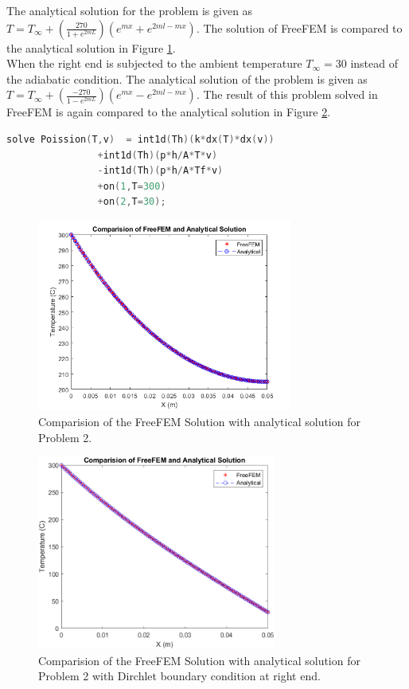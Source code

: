 \documentclass[11pt]{article} %
\begin{document}
The analytical solution for the problem is given as $T =  T_{\infty} + \left(\frac{270}{1+e^{2mL}}\right) \left(e^{mx} + e^{2ml -mx} \right)$. The solution of FreeFEM is compared to the analytical solution in Figure \ref{fig:q2}.\\

When the right end is subjected to the ambient temperature $ T_{\infty} = 30$ instead of the adiabatic condition. The analytical solution of the problem is given as $T =  T_{\infty} + \left(\frac{-270}{1-e^{2mL}}\right) \left(e^{mx} - e^{2ml -mx} \right)$. The result of this problem solved in FreeFEM is again compared to the analytical solution in Figure \ref{fig:q22}.\\

\vspace{0.5cm}

\begin{lstlisting}[language=C++, caption=Change in the Problem 2 Code to accomodate for the Dirchlet B.C. at the right end]
solve Poission(T,v)  = int1d(Th)(k*dx(T)*dx(v))
				+int1d(Th)(p*h/A*T*v)
				-int1d(Th)(p*h/A*Tf*v)
				+on(1,T=300)
				+on(2,T=30);
\end{lstlisting}

\begin{figure}[H]
\centering
\includegraphics[width=0.75\textwidth]{q2.png}
\caption{Comparision of the FreeFEM Solution with analytical solution for Problem 2.}
\label{fig:q2}
\end{figure}

\begin{figure}[H]
\centering
\includegraphics[width=0.7\textwidth]{q22.png}
\caption{Comparision of the FreeFEM Solution with analytical solution for Problem 2 with Dirchlet boundary condition at right end.}
\label{fig:q22}
\end{figure}
\end{document}
